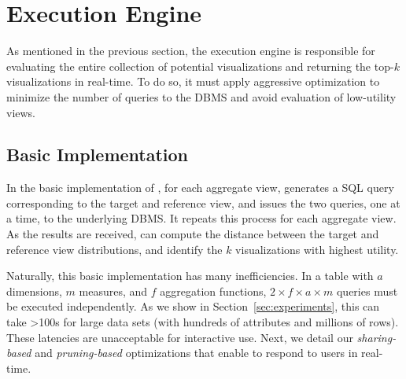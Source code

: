 \section{\SeeDB Execution Engine}
\label{sec:optimizer}

As mentioned in the previous section, the \SeeDB execution engine is responsible for
evaluating the entire collection of potential visualizations and returning the top-$k$
visualizations in real-time.
To do so, it must apply aggressive optimization to minimize the number of queries to the
DBMS and avoid evaluation of low-utility views.

\subsection{Basic Implementation}
\label{sec:basic_implementation}

In the basic implementation of \SeeDB, for each aggregate view, \SeeDB generates
a SQL query corresponding to the target
and reference view, and issues
the two queries, one at a time, to the underlying DBMS.
It repeats this process for each aggregate view.
As the results are received, \SeeDB can compute the
distance between the target and reference view
distributions, and identify the $k$ visualizations
with highest utility. 

Naturally, this basic implementation has many inefficiencies.
In a table with $a$ dimensions, $m$ measures, and $f$ aggregation functions, 
$2\times f \times a \times  m$ queries must be executed independently.  
As we show in Section~\ref{sec:experiments}, this can take >100s for
large data sets (with hundreds of attributes and millions of rows).
These latencies are unacceptable for interactive use.
Next, we detail our {\em sharing-based} and {\em pruning-based} optimizations
that enable \SeeDB to respond to users in real-time.



